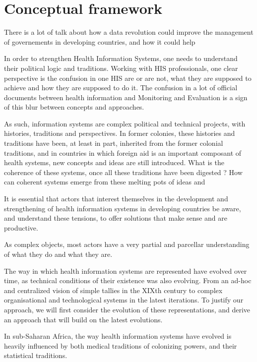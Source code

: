 \section{Conceptual framework}

There is a lot of talk about how a data revolution could improve the management of governements in developing countries, and how it could help 

In order to strengthen Health Information Systems, one needs to understand their political logic and traditions. Working with HIS professionals, one clear perspective is the confusion in one HIS are or are not, what they are supposed to achieve and how they are supposed to do it. The confusion in a lot of official documents between health information and Monitoring and Evaluation is a sign of this blur between concepts and approaches.

As such, information systems are complex political and technical projects, with histories, traditions and perspectives. In former colonies, these histories and traditions have been, at least in part, inherited from the former colonial traditions, and in countries in which foreign aid is an important composant of health systems, new concepts and ideas are still introduced. What is the coherence of these systems, once all these traditions have been digested ? How can coherent systems emerge from these melting pots of ideas and

It is essential that actors that interest themselves in the development and strengthening of health information systems in developing countries be aware, and understand these tensions, to offer solutions that make sense and are productive.

As complex objects, most actors have a very partial and parcellar understanding of what they do and what they are.

The way in which health information systems are represented have evolved over time, as technical conditions of their existence was also evolving. From an ad-hoc and centralized vision of simple tallies in the XIXth century %
to complex organisational and technological systems in the latest iterations. To justify our approach, we will first consider the evolution of these representations, and derive an approach that will build on the latest evolutions.

In sub-Saharan Africa, the way health information systems have evolved is heavily influenced by both medical traditions of colonizing powers, and their statistical traditions.

